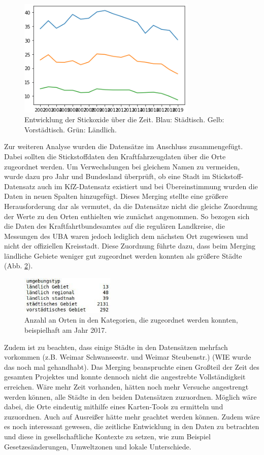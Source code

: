 \documentclass[11pt,a4paper,oneside,german]{article}
\begin{document}
	\begin{figure}[h!]
		\centering
		\includegraphics[width=8.5cm]{NO2Entwicklung.png}
		\caption{Entwicklung der Stickoxide über die Zeit. Blau: Städtisch. Gelb: Vorstädtisch. Grün: Ländlich.}
		\label{fig:NO2Entwicklung}
	\end{figure}
	
	Zur weiteren Analyse wurden die Datensätze im Anschluss zusammengefügt. Dabei sollten die Stickstoffdaten den Kraftfahrzeugdaten über die Orte zugeordnet werden. Um Verwechslungen bei gleichem Namen zu vermeiden, wurde dazu pro Jahr und Bundesland überprüft, ob eine Stadt im Stickstoff-Datensatz auch im KfZ-Datensatz existiert und bei Übereinstimmung wurden die Daten in neuen Spalten hinzugefügt. Dieses Merging stellte eine größere Herausforderung dar als vermutet, da die Datensätze nicht die gleiche Zuordnung der Werte zu den Orten enthielten wie zunächst angenommen. So bezogen sich die Daten des Kraftfahrtbundesamtes auf die regulären Landkreise, die Messungen des UBA waren jedoch lediglich dem nächsten Ort zugewiesen und nicht der offiziellen Kreisstadt. Diese Zuordnung führte dazu, dass beim Merging ländliche Gebiete weniger gut zugeordnet werden konnten als größere Städte (Abb. \ref{fig:Kategorien}).\\
	
	\begin{figure}[h!]
		\centering
		\includegraphics[width=4.5cm]{Kategorien.jpg}
		\caption{Anzahl an Orten in den Kategorien, die zugeordnet werden konnten, beispielhaft am Jahr 2017.}
		\label{fig:Kategorien}
	\end{figure}
	
	Zudem ist zu beachten, dass einige Städte in den Datensätzen mehrfach vorkommen (z.B. Weimar Schwanseestr. und Weimar Steubenstr.) (WIE wurde das noch mal gehandhabt). Das Merging beanspruchte einen Großteil der Zeit des gesamten Projektes und konnte dennoch nicht die angestrebte Vollständigkeit erreichen. Wäre mehr Zeit vorhanden, hätten noch mehr Versuche angestrengt werden können, alle Städte in den beiden Datensätzen zuzuordnen. Möglich wäre dabei, die Orte eindeutig mithilfe eines Karten-Tools zu ermitteln und zuzuordnen. Auch auf Ausreißer hätte mehr geachtet werden können. Zudem wäre es noch interessant gewesen, die zeitliche Entwicklung in den Daten zu betrachten und diese in gesellschaftliche Kontexte zu setzen, wie zum Beispiel Gesetzesänderungen, Umweltzonen und lokale Unterschiede.
	
\end{document}
